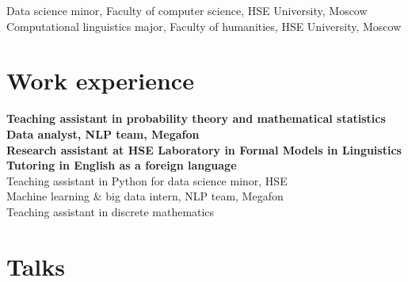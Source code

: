 \documentclass[11pt]{article} %
\begin{document}
 Data science minor, Faculty of computer science, HSE University, Moscow\\
 Computational linguistics major, Faculty of humanities, HSE University, Moscow


\section*{Work experience}

 \textbf{Teaching assistant in probability theory and mathematical statistics}\\
 \textbf{Data analyst, NLP team, Megafon}\\
 \textbf{Research assistant at HSE Laboratory in Formal Models in Linguistics}\\
 \textbf{Tutoring in English as a foreign language}\\
 Teaching assistant in Python for data science minor, HSE\\
 Machine learning \& big data intern, NLP team, Megafon\\
Teaching assistant in discrete mathematics

\section*{Talks}
\end{document}
